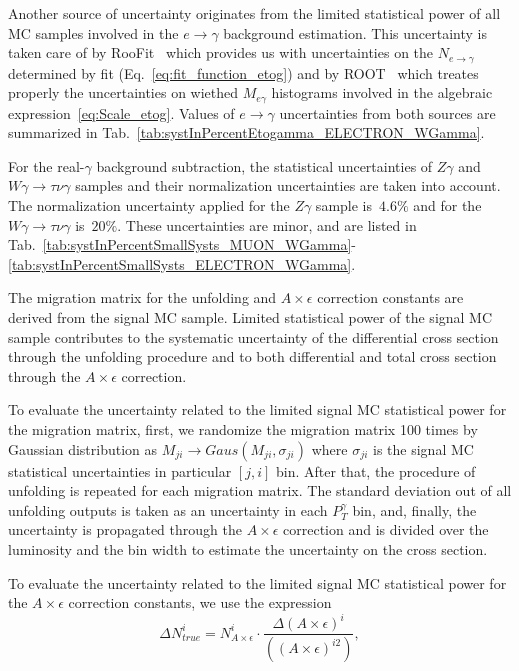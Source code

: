 Another source of uncertainty originates from the limited statistical power of all MC samples involved in the $e\rightarrow\gamma$ background estimation. This uncertainty is taken care of by RooFit~\cite{ref_RooFit} which provides us with uncertainties on the $N_{e\rightarrow\gamma}$ determined by fit (Eq.~\ref{eq:fit_function_etog}) and by ROOT~\cite{ref_ROOT} which treates properly the uncertainties on wiethed $M_{e\gamma}$ histograms involved in the algebraic expression~\ref{eq:Scale_etog}. Values of $e\rightarrow\gamma$ uncertainties from both sources are summarized in Tab.~\ref{tab:systInPercentEtogamma_ELECTRON_WGamma}.


For the real-$\gamma$ background subtraction, the statistical uncertainties of $Z\gamma$ and $W\gamma\rightarrow\tau\nu\gamma$ samples and their normalization uncertainties are taken into account. The normalization uncertainty applied for the $Z\gamma$ sample is~$4.6\%$ and for the $W\gamma\rightarrow\tau\nu\gamma$ is~$20\%$. These uncertainties are minor, and are listed in Tab.~\ref{tab:systInPercentSmallSysts_MUON_WGamma}-\ref{tab:systInPercentSmallSysts_ELECTRON_WGamma}.


The migration matrix for the unfolding and $A\times\epsilon$ correction constants are derived from the signal MC sample. Limited statistical power of the signal MC sample contributes to the systematic uncertainty of the differential cross section through the unfolding procedure and to both differential and total cross section through the  $A\times\epsilon$ correction. 

To evaluate the uncertainty related to the limited signal MC statistical power for the migration matrix, first, we randomize the migration matrix 100 times by Gaussian distribution as $M_{ji}\rightarrow Gaus(M_{ji},\sigma_{ji})$ where $\sigma_{ji}$ is the signal MC statistical uncertainties in particular $[j,i]$ bin. After that, the procedure of unfolding is repeated for each migration matrix. The standard deviation out of all unfolding outputs is taken as an uncertainty in each $P_T^{\gamma}$ bin, and, finally, the uncertainty is propagated through the $A\times\epsilon$ correction and is divided over the luminosity and the bin width to estimate the uncertainty on the cross section.

To evaluate the uncertainty related to the limited signal MC statistical power for the $A \times \epsilon$ correction constants, we use the expression
\begin{equation}
\Delta N_{true}^i= N_{A\times \epsilon}^i \cdot \frac{\Delta{(A\times \epsilon)^i}} { ((A\times \epsilon)^{i2})}, 
\end{equation}

